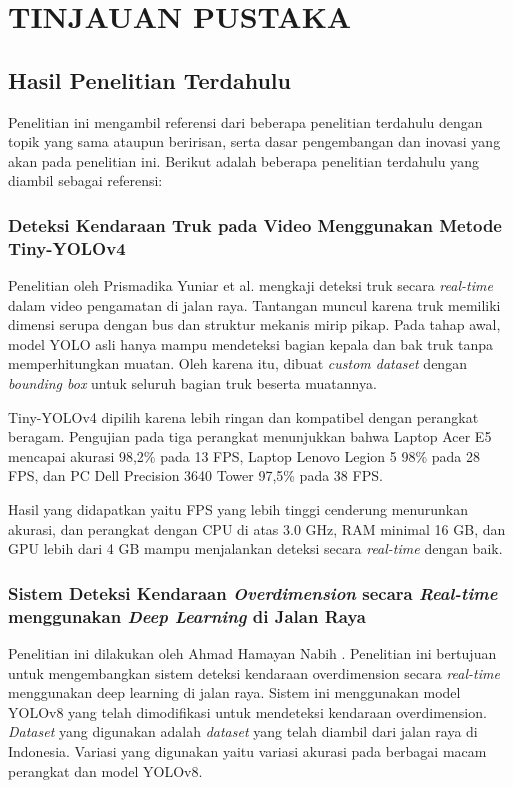 \chapter{TINJAUAN PUSTAKA}
\label{chap:tinjauanpustaka}


\section{Hasil Penelitian Terdahulu}
\label{sec:hasilpenelitianterdahulu}
Penelitian ini mengambil referensi dari beberapa penelitian terdahulu dengan topik yang sama ataupun beririsan, serta dasar pengembangan dan inovasi yang akan pada penelitian ini. Berikut adalah beberapa penelitian terdahulu yang diambil sebagai referensi:

\subsection{Deteksi Kendaraan Truk pada Video Menggunakan Metode Tiny-YOLOv4}
\label{subsec:deteksikendaraantrukprismadika}
Penelitian oleh Prismadika Yuniar et al. \parencite*{prismadika2023} mengkaji deteksi truk secara \emph{real-time} dalam video pengamatan di jalan raya. Tantangan muncul karena truk memiliki dimensi serupa dengan bus dan struktur mekanis mirip pikap. Pada tahap awal, model YOLO asli hanya mampu mendeteksi bagian kepala dan bak truk tanpa memperhitungkan muatan. Oleh karena itu, dibuat \emph{custom dataset} dengan \emph{bounding box} untuk seluruh bagian truk beserta muatannya.

Tiny-YOLOv4 dipilih karena lebih ringan dan kompatibel dengan perangkat beragam. Pengujian pada tiga perangkat menunjukkan bahwa Laptop Acer E5 mencapai akurasi 98,2\% pada 13 FPS, Laptop Lenovo Legion 5 98\% pada 28 FPS, dan PC Dell Precision 3640 Tower 97,5\% pada 38 FPS. 

Hasil yang didapatkan yaitu FPS yang lebih tinggi cenderung menurunkan akurasi, dan perangkat dengan CPU di atas 3.0 GHz, RAM minimal 16 GB, dan GPU lebih dari 4 GB mampu menjalankan deteksi secara \emph{real-time} dengan baik.

\subsection{Sistem Deteksi Kendaraan \emph{Overdimension} secara \emph{Real-time} menggunakan \emph{Deep Learning} di Jalan Raya}
\label{subsec:deteksikendaraanoverdimensionhamayan}
Penelitian ini dilakukan oleh Ahmad Hamayan Nabih \parencite*{hamayan2024}. Penelitian ini bertujuan untuk mengembangkan sistem deteksi kendaraan overdimension secara \emph{real-time} menggunakan deep learning di jalan raya. Sistem ini menggunakan model YOLOv8 yang telah dimodifikasi untuk mendeteksi kendaraan overdimension. \emph{Dataset} yang digunakan adalah \emph{dataset} yang telah diambil dari jalan raya di Indonesia. Variasi yang digunakan yaitu variasi akurasi pada berbagai macam perangkat dan model YOLOv8.

